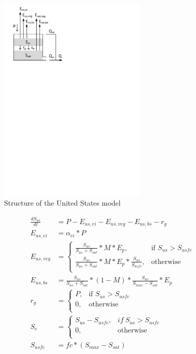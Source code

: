 { 																	%
\begin{figure}
\includegraphics[trim=1cm 21cm 9cm 1cm,width=7cm,keepaspectratio]{./AppA_files/08_schematic.pdf}
\caption{Structure of the United States model} \label{fig:08_schematic}
\end{figure}

\begin{align}
	\frac{dS_{us}}{dt} &= P - E_{us,ei}-E_{us,veg}-E_{us,bs}-r_g \\
	E_{us,ei} &= \alpha_{ei}*P\\
	E_{us,veg} &= \begin{cases}
		\frac{S_{us}}{S_{us}+S_{sat}}*M*E_p, &\text{if } S_{us} > S_{usfc} \\
		\frac{S_{us}}{S_{us}+S_{sat}}*M*E_p*\frac{S_{us}}{S_{usfc}}, & \text{otherwise} \\
	\end{cases} \\
	E_{us,bs} &= \frac{S_{us}}{S_{us}+S_{sat}}*(1-M)*\frac{S_{us}}{S_{max}-S_{sat}}*E_p\\
	r_g &=\begin{cases}
		P, &\text{if } S_{us} > S_{usfc}\\
		0, & \text{otherwise} \\
	\end{cases}\\
	S_e &= \begin{cases}
			S_{us} - S_{usfc}, & if~S_{us} > S_{usfc}\\
			0, & \text{otherwise} \\
			\end{cases}\\
	S_{usfc} &= fc*(S_{max} - S_{sat})
\end{align}
} %

